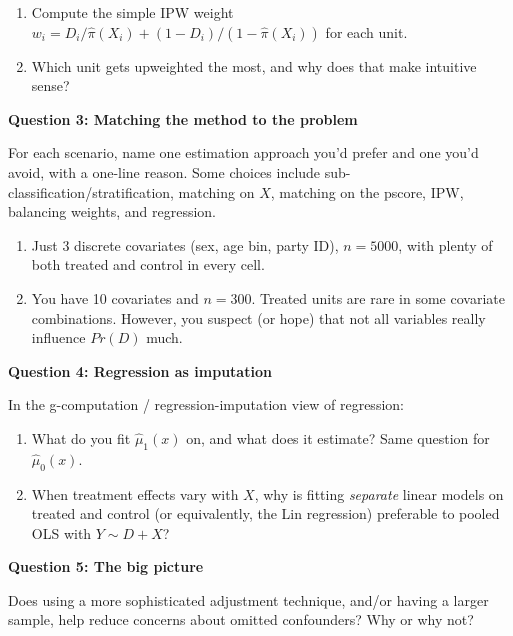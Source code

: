 \documentclass[11pt]{article}
\begin{document}
\begin{enumerate}[label=(\alph*)]
\item Compute the simple IPW weight $w_i = D_i/\widehat{\pi}(X_i) + (1-D_i)/(1-\widehat{\pi}(X_i))$ for each unit.

\vspace{2.2cm}

\item Which unit gets upweighted the most, and why does that make intuitive sense?

\vspace{1.8cm}
\end{enumerate}

\newpage

\noindent\textbf{Question 3: Matching the method to the problem}

\medskip
\noindent For each scenario, name one estimation approach you'd prefer and one you'd avoid, with a one-line reason. Some choices include sub-classification/stratification, matching on $X$, matching on the pscore, IPW, balancing weights, and regression.

\begin{enumerate}[label=(\alph*)]

\item Just 3 discrete covariates (sex, age bin, party ID), $n = 5000$, with plenty of both treated and control in every cell.

\vspace{1.8cm}
\item You have 10 covariates and $n = 300$.  Treated units are rare in some covariate combinations. However, you suspect (or hope) that not all variables really influence $Pr(D)$ much.



\vspace{1.8cm}
\end{enumerate}


\noindent\textbf{Question 4: Regression as imputation}

\medskip
\noindent In the g-computation / regression-imputation view of regression:

\begin{enumerate}[label=(\alph*)]
\item What do you fit $\widehat{\mu}_1(x)$ on, and what does it estimate?  Same question for $\widehat{\mu}_0(x)$.


\vspace{2cm}

\item When treatment effects vary with $X$, why is fitting \emph{separate} linear models on treated and control (or equivalently, the Lin regression) preferable to pooled OLS with $Y \sim D + X$?

\vspace{2cm}

\end{enumerate}


\noindent\textbf{Question 5: The big picture}

\medskip
\noindent Does using a more sophisticated adjustment technique, and/or having a larger sample, help reduce concerns about omitted confounders?  Why or why not?

\vspace{2.5cm}
\end{document}
